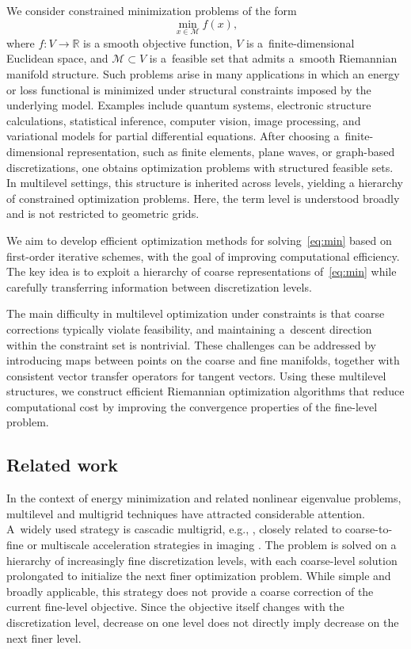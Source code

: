 \documentclass[11pt,reqno]{amsart}
\theoremstyle{plain}
\newcommand\R{\mathbb R}
\newcommand{\M}{\mathcal{M}}
\begin{document}
	We consider constrained minimization problems of the form
	\begin{equation}\label{eq:min}
		\min_{x\in\M} f(x),
	\end{equation}
	where $f:V\to\R$ is a smooth objective function, $V$ is a~finite-dimensional Euclidean space, and $\M\subset V$ is a~feasible set that admits a~smooth Riemannian manifold structure. Such problems arise in many applications in which an energy or loss functional is minimized under structural constraints imposed by the underlying model. Examples include quantum systems, electronic structure calculations, statistical inference, computer vision, image processing, and variational models for partial differential equations. After choosing a~finite-dimensional representation, such as finite elements, plane waves, or graph-based discretizations,  one obtains optimization problems with structured feasible sets. In multilevel settings, this structure is inherited across levels, yielding a hierarchy of constrained optimization problems. Here, the term level is understood broadly and is not restricted to geometric grids. 
	
	We aim to develop efficient optimization methods for solving~\eqref{eq:min} based on first-order iterative schemes, with the goal of improving computational efficiency. 
	The key idea is to exploit a hierarchy of coarse representations of~\eqref{eq:min} while carefully transferring information between discretization levels.
	
	The main difficulty in multilevel optimization under constraints is that coarse corrections typically violate feasibility, and maintaining a~descent direction within the constraint set is nontrivial. These challenges can be addressed by introducing maps between points on the coarse and fine manifolds, together with consistent vector transfer operators for tangent vectors. Using these multilevel structures, we construct efficient Riemannian optimization algorithms that reduce computational cost by improving the convergence properties of the fine-level problem.
	
	\subsection{Related work}
	\label{ssec:RelatedWork}
	
	In the context of energy minimization and related nonlinear eigenvalue problems, multilevel and multigrid techniques have attracted considerable attention. A~widely used strategy is cascadic multigrid, e.g., \cite{AntLT17,BorH08,WuWB17}, closely related to coarse-to-fine or multiscale 
	acceleration strategies in imaging \cite{RouxLeclercHild2014}. The problem is 
	solved on a hierarchy of increasingly fine discretization levels, with each 
	coarse-level solution prolongated to initialize the next finer optimization 
	problem. While simple and broadly applicable, this strategy does not provide a 
	coarse correction of the current fine-level objective. Since the objective 
	itself changes with the discretization level, decrease on one level does not 
	directly imply decrease on the next finer level.
	
\end{document}
